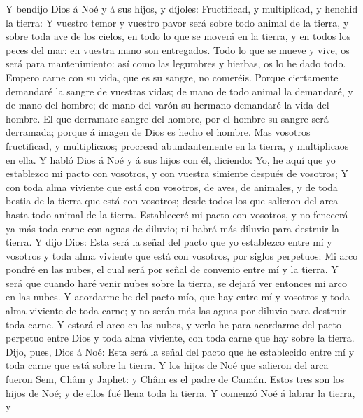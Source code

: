  Y bendijo Dios á Noé y á sus hijos, y díjoles:
Fructificad, y multiplicad, y henchid la tierra:  Y
vuestro temor y vuestro pavor será sobre todo animal de la tierra, y
sobre toda ave de los cielos, en todo lo que se moverá en la tierra, y
en todos los peces del mar: en vuestra mano son entregados.
 Todo lo que se mueve y vive, os será para mantenimiento:
así como las legumbres y hierbas, os lo he dado todo. 
Empero carne con su vida, que es su sangre, no comeréis. 
Porque ciertamente demandaré la sangre de vuestras vidas; de mano de
todo animal la demandaré, y de mano del hombre; de mano del varón su
hermano demandaré la vida del hombre.  El que derramare
sangre del hombre, por el hombre su sangre será derramada; porque á
imagen de Dios es hecho el hombre.  Mas vosotros
fructificad, y multiplicaos; procread abundantemente en la tierra, y
multiplicaos en ella.  Y habló Dios á Noé y á sus hijos
con él, diciendo:  Yo, he aquí que yo establezco mi pacto
con vosotros, y con vuestra simiente después de vosotros;
 Y con toda alma viviente que está con vosotros, de aves,
de animales, y de toda bestia de la tierra que está con vosotros; desde
todos los que salieron del arca hasta todo animal de la tierra.
 Estableceré mi pacto con vosotros, y no fenecerá ya más
toda carne con aguas de diluvio; ni habrá más diluvio para destruir la
tierra.  Y dijo Dios: Esta será la señal del pacto que yo
establezco entre mí y vosotros y toda alma viviente que está con
vosotros, por siglos perpetuos:  Mi arco pondré en las
nubes, el cual será por señal de convenio entre mí y la tierra.
 Y será que cuando haré venir nubes sobre la tierra, se
dejará ver entonces mi arco en las nubes.  Y acordarme he
del pacto mío, que hay entre mí y vosotros y toda alma viviente de toda
carne; y no serán más las aguas por diluvio para destruir toda carne.
 Y estará el arco en las nubes, y verlo he para acordarme
del pacto perpetuo entre Dios y toda alma viviente, con toda carne que
hay sobre la tierra.  Dijo, pues, Dios á Noé: Esta será
la señal del pacto que he establecido entre mí y toda carne que está
sobre la tierra.  Y los hijos de Noé que salieron del
arca fueron Sem, Châm y Japhet: y Châm es el padre de Canaán.
 Estos tres son los hijos de Noé; y de ellos fué llena
toda la tierra.  Y comenzó Noé á labrar la tierra, y
